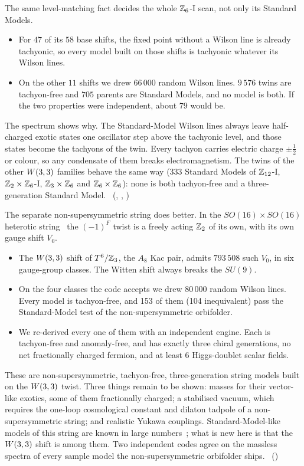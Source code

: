 The same level-matching fact decides the whole $\mathbb{Z}_6$-I scan, not only its Standard Models.
\begin{itemize}
\item For $47$ of its $58$ base shifts, the fixed point without a Wilson line is already tachyonic, so every
      model built on those shifts is tachyonic whatever its Wilson lines.
\item On the other $11$ shifts we drew $66\,000$ random Wilson lines. $9\,576$ twins are tachyon-free and
      $705$ parents are Standard Models, and no model is both. If the two properties were independent, about
      $79$ would be.
\end{itemize}
The spectrum shows why. The Standard-Model Wilson lines always leave half-charged exotic states one
oscillator step above the tachyonic level, and those states become the tachyons of the twin. Every tachyon
carries electric charge $\pm\tfrac12$ or colour, so any condensate of them breaks electromagnetism. The twins
of the other $W(3,3)$ families behave the same way ($333$ Standard Models of $\mathbb{Z}_{12}$-I, $\mathbb{Z}_2\times\mathbb{Z}_6$-I,
$\mathbb{Z}_3\times\mathbb{Z}_6$ and $\mathbb{Z}_6\times\mathbb{Z}_6$): none is both tachyon-free and a three-generation Standard Model.
\tierC\ (,
,
)

The separate non-supersymmetric string does better. In the $SO(16)\times SO(16)$ heterotic
string~\cite{EscalanteNotario2025,PerezMartinez2021} the $(-1)^F$ twist is a freely acting $\mathbb{Z}_2$ of its own, with
its own gauge shift $V_0$.
\begin{itemize}
\item The $W(3,3)$ shift of $T^6/\mathbb{Z}_3$, the $A_8$ Kac pair, admits $793\,508$ such $V_0$, in six gauge-group
      classes. The Witten shift always breaks the $SU(9)$.
\item On the four classes the code accepts we drew 80\,000 random Wilson lines. Every model is
      tachyon-free, and 153 of them (104 inequivalent) pass the Standard-Model test of the
      non-supersymmetric orbifolder.
\item We re-derived every one of them with an independent engine. Each is tachyon-free and anomaly-free, and
      has exactly three chiral generations, no net fractionally charged fermion, and at least 6
      Higgs-doublet scalar fields.
\end{itemize}
These are non-supersymmetric, tachyon-free, three-generation string models built on the $W(3,3)$ twist. Three
things remain to be shown: masses for their vector-like exotics, some of them fractionally charged; a
stabilised vacuum, which requires the one-loop cosmological constant and dilaton tadpole of a
non-supersymmetric string; and realistic Yukawa couplings. Standard-Model-like models of this string are
known in large numbers~\cite{PerezMartinez2021}; what is new here is that the $W(3,3)$ shift is among them. Two
independent codes agree on the massless spectra of every sample model the non-supersymmetric orbifolder
ships. \tierC\ ()

